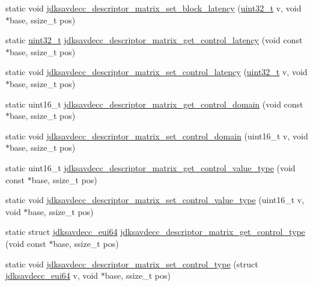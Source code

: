 \begin{DoxyCompactItemize}
\item 
static void \hyperlink{group__descriptor__matrix_gaf5dc6d481666fb9d9638ca40997ac6da}{jdksavdecc\+\_\+descriptor\+\_\+matrix\+\_\+set\+\_\+block\+\_\+latency} (\hyperlink{parse_8c_a6eb1e68cc391dd753bc8ce896dbb8315}{uint32\+\_\+t} v, void $\ast$base, ssize\+\_\+t pos)
\item 
static \hyperlink{parse_8c_a6eb1e68cc391dd753bc8ce896dbb8315}{uint32\+\_\+t} \hyperlink{group__descriptor__matrix_ga1773d6647530cade513b339510015bdf}{jdksavdecc\+\_\+descriptor\+\_\+matrix\+\_\+get\+\_\+control\+\_\+latency} (void const $\ast$base, ssize\+\_\+t pos)
\item 
static void \hyperlink{group__descriptor__matrix_gad5b25672a60689e53bccb0a6f4973b8e}{jdksavdecc\+\_\+descriptor\+\_\+matrix\+\_\+set\+\_\+control\+\_\+latency} (\hyperlink{parse_8c_a6eb1e68cc391dd753bc8ce896dbb8315}{uint32\+\_\+t} v, void $\ast$base, ssize\+\_\+t pos)
\item 
static uint16\+\_\+t \hyperlink{group__descriptor__matrix_ga136f95b427f0fd669a6d0637e2eff142}{jdksavdecc\+\_\+descriptor\+\_\+matrix\+\_\+get\+\_\+control\+\_\+domain} (void const $\ast$base, ssize\+\_\+t pos)
\item 
static void \hyperlink{group__descriptor__matrix_gad09ea750e42c18964924f3fb89ef66a0}{jdksavdecc\+\_\+descriptor\+\_\+matrix\+\_\+set\+\_\+control\+\_\+domain} (uint16\+\_\+t v, void $\ast$base, ssize\+\_\+t pos)
\item 
static uint16\+\_\+t \hyperlink{group__descriptor__matrix_ga646695af74b45e86cf0690416bac3faa}{jdksavdecc\+\_\+descriptor\+\_\+matrix\+\_\+get\+\_\+control\+\_\+value\+\_\+type} (void const $\ast$base, ssize\+\_\+t pos)
\item 
static void \hyperlink{group__descriptor__matrix_gaa4411e574c75890fe990f161a2477e7b}{jdksavdecc\+\_\+descriptor\+\_\+matrix\+\_\+set\+\_\+control\+\_\+value\+\_\+type} (uint16\+\_\+t v, void $\ast$base, ssize\+\_\+t pos)
\item 
static struct \hyperlink{structjdksavdecc__eui64}{jdksavdecc\+\_\+eui64} \hyperlink{group__descriptor__matrix_ga419bd3facce1d8294b8661b89312ef45}{jdksavdecc\+\_\+descriptor\+\_\+matrix\+\_\+get\+\_\+control\+\_\+type} (void const $\ast$base, ssize\+\_\+t pos)
\item 
static void \hyperlink{group__descriptor__matrix_ga8fb0f46cb40a74d2505a59919cfb5834}{jdksavdecc\+\_\+descriptor\+\_\+matrix\+\_\+set\+\_\+control\+\_\+type} (struct \hyperlink{structjdksavdecc__eui64}{jdksavdecc\+\_\+eui64} v, void $\ast$base, ssize\+\_\+t pos)

\end{DoxyCompactItemize}
